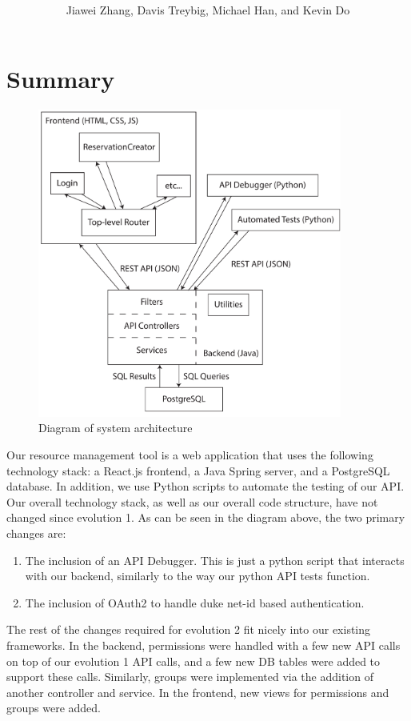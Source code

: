 \documentclass[12pt]{article}
\title{\horrule{5pt}\\\vspace{0.4cm}{\bf \mytitle}\\}
\author{Jiawei Zhang, Davis Treybig, Michael Han, and Kevin Do}
\date{\horrule{1pt}}
\begin{document}
\maketitle{}
\section{Summary}
\begin{figure}[h]
\begin{center}
\includegraphics[height=4in]{ev2_design_cropped.pdf}
\end{center}
\caption{Diagram of system architecture}
\label{fig:design}
\end{figure}

Our resource management tool is a web application that uses the following technology stack: a React.js frontend, a Java Spring server, and a PostgreSQL database. In addition, we use Python scripts to automate the testing of our API. Our overall technology stack, as well as our overall code structure, have not changed since evolution 1. As can be seen in the diagram above, the two primary changes are:
\begin{enumerate}
    \item The inclusion of an API Debugger. This is just a python script that interacts with our backend, similarly to the way our python API tests function. 
    \item The inclusion of OAuth2 to handle duke net-id based authentication.
\end{enumerate}

The rest of the changes required for evolution 2 fit nicely into our existing frameworks. In the backend, permissions were handled with a few new API calls on top of our evolution 1 API calls, and a few new DB tables were added to support these calls. Similarly, groups were implemented via the addition of another controller and service. In the frontend, new views for permissions and groups were added.  
\end{document}
